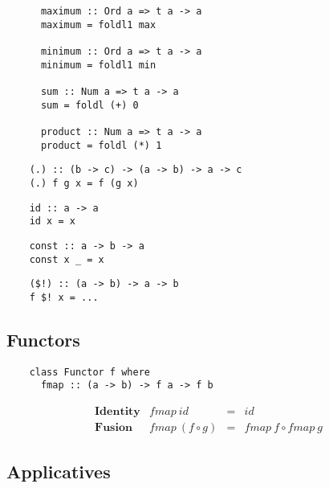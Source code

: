 \begin{multicols}{2}
\begin{verbatim}
	  maximum :: Ord a => t a -> a 
	  maximum = foldl1 max
	  
	  minimum :: Ord a => t a -> a 
	  minimum = foldl1 min
	  
	  sum :: Num a => t a -> a 
	  sum = foldl (+) 0
	  
	  product :: Num a => t a -> a
	  product = foldl (*) 1
	\end{verbatim}
	
	\begin{verbatim}
	(.) :: (b -> c) -> (a -> b) -> a -> c
	(.) f g x = f (g x)
	\end{verbatim}
	
	\begin{verbatim}
	id :: a -> a
	id x = x
	\end{verbatim}
	
	\begin{verbatim}
	const :: a -> b -> a
	const x _ = x
	\end{verbatim}
	
	\begin{verbatim}
	($!) :: (a -> b) -> a -> b
	f $! x = ...
	\end{verbatim}
	
	\subsection*{Functors}
	
	\begin{verbatim}
	class Functor f where 
	  fmap :: (a -> b) -> f a -> f b
	\end{verbatim}
	\begin{displaymath}
	\begin{array}{lrcl}
	\textbf{Identity} & \mathit{fmap}~\mathit{id} & = &  \mathit{id} \\
	\textbf{Fusion} & \mathit{fmap}~(f \circ g) & = & \mathit{fmap}~f \circ \mathit{fmap}~g
	\end{array}
	\end{displaymath}
	
	\subsection*{Applicatives}
	

\end{multicols}
